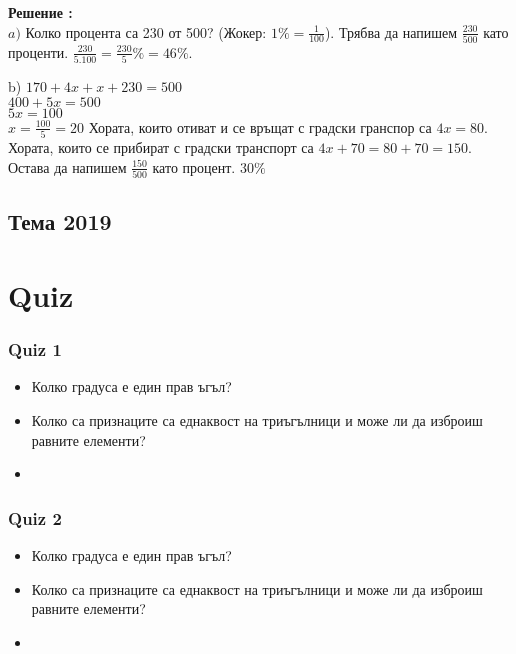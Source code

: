 \documentclass{article}
\newcounter{solution}
\newcommand\solution{%
	\stepcounter{solution}%
	\textbf{Решение :}\\%
}
\begin{document}
\solution
$a )$ Колко процента са 230 от 500? (Жокер: $1\% = \frac{1}{100} $). Трябва да напишем  $\frac{230}{500}$ като проценти. $\frac{230}{5.100} = \frac{230}{5}\% = 46\%$.

b) $170 + 4x + x+ 230 = 500 $ \\
$ 400 + 5x = 500 $ \\ $5x = 100 $ \\
$x = \frac{100}{5} = 20  $
Хората, които отиват и се връщат с градски гранспор са $4x = 80 $. Хората, които се прибират с градски транспорт са $4x +70 = 80 + 70 = 150.$ Остава да напишем $\frac{150}{500} $ като процент. 
$30\% $


\subsection{Тема 2019}



\newpage
\section{Quiz}

\subsubsection{Quiz 1}
\begin{itemize}
	\item Колко градуса е един прав ъгъл?
	\item Колко са признаците са еднаквост на триъгълници и може ли да изброиш равните елементи?
	\item 
\end{itemize}


\subsubsection{Quiz 2}
\begin{itemize}
	\item Колко градуса е един прав ъгъл?
	\item Колко са признаците са еднаквост на триъгълници и може ли да изброиш равните елементи?
	\item 
\end{itemize}
\end{document}
